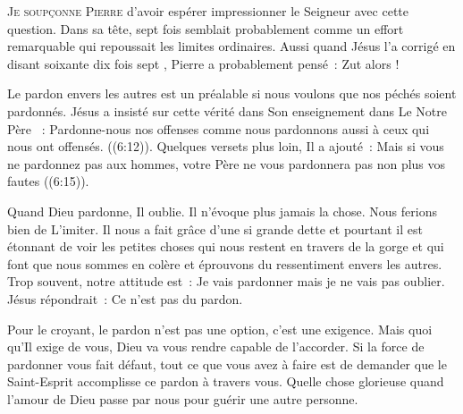 


\lettrine{J}{e soupçonne Pierre} d'avoir espérer impressionner le Seigneur
 avec cette question. Dans sa tête, \og sept fois \fg{} semblait probablement
 comme un effort remarquable qui repoussait les limites ordinaires.
 Aussi quand Jésus l'a corrigé en disant \og soixante dix fois sept \fg{},
 Pierre a probablement pensé~: \og Zut alors ! \fg{}

Le pardon envers les autres est un préalable si nous voulons
 que nos péchés soient pardonnés. Jésus a insisté sur cette vérité
 dans Son enseignement dans \og Le Notre Père \fg{}~: 
 \og Pardonne-nous nos offenses comme nous pardonnons aussi
 à ceux qui nous ont offensés. \fg{} 
 ((6:12)). Quelques versets plus loin, Il a ajouté~: 
 \og Mais si vous ne pardonnez pas aux hommes,
 votre Père ne vous pardonnera pas non plus vos fautes \fg{} 
 ((6:15)). 


Quand Dieu pardonne, Il oublie. Il n'évoque plus jamais la chose.
 Nous ferions bien de L'imiter. Il nous a fait grâce d'une si grande dette
 et pourtant il est étonnant de voir les petites choses
 qui nous restent en travers de la gorge et qui font que nous sommes en colère
 et éprouvons du ressentiment envers les autres.
 Trop souvent, notre attitude est~: 
 \og Je vais pardonner \ocadr mais je ne vais pas oublier. \fg{}
 Jésus répondrait~: \og Ce n'est pas du pardon. \fg{}

Pour le croyant, le pardon n'est pas une option, c'est une exigence.
 Mais quoi qu'Il  exige de vous, Dieu va vous rendre
 capable de l'accorder. Si la force de pardonner vous fait défaut,
 tout ce que vous avez à faire est de demander que le Saint-Esprit
 accomplisse ce pardon à travers vous.
 Quelle chose glorieuse quand l'amour de Dieu passe par nous pour guérir
 une autre personne. 

